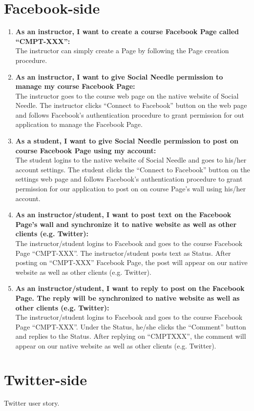 \section{Facebook-side}

\begin{enumerate}
	\item \textbf{As an instructor, I want to create a course Facebook Page called ``CMPT-XXX'':} \\
	The instructor can simply create a Page by following the Page creation procedure.
	
	\item \textbf{As an instructor, I want to give Social Needle permission to manage my course Facebook Page:} \\
	The instructor goes to the course web page on the native website of Social Needle. The instructor clicks ``Connect to Facebook'' button on the web page and follows Facebook's authentication procedure to grant permission for out application to manage the Facebook Page.
	
	\item \textbf{As a student, I want to give Social Needle permission to post on course Facebook Page using my account:} \\
	 The student logins to the native website of Social Needle and goes to his/her account settings. The student clicks the ``Connect to Facebook'' button on the settings web page and follows Facebook's authentication procedure to grant permission for our application to post on on course Page's wall using his/her account.
	
	\item \textbf{As an instructor/student, I want to post text on the Facebook Page's wall and synchronize it to native website as well as other clients (e.g. Twitter):} \\
	The instructor/student logins to Facebook and goes to the course Facebook Page ``CMPT-XXX''. The instructor/student posts text as Status. After posting on ``CMPT-XXX'' Facebook Page, the post will appear on our native website as well as other clients (e.g. Twitter).
	
	\item \textbf{As an instructor/student, I want to reply to post on the Facebook Page. The reply will be synchronized to native website as well as other clients (e.g. Twitter):} \\
	The instructor/student logins to Facebook and goes to the course Facebook Page ``CMPT-XXX''. Under the Status, he/she clicks the ``Comment'' button and replies to the Status. After replying on ``CMPTXXX'', the comment will appear on our native website as well as other clients (e.g. Twitter).
\end{enumerate}

\section{Twitter-side}
Twitter user story.